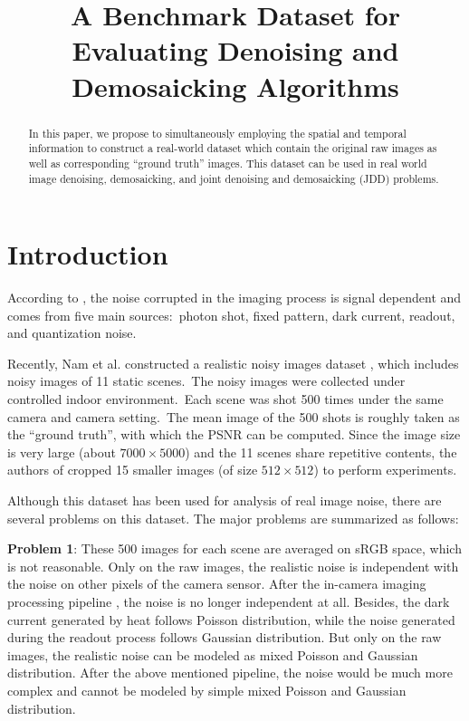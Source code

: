 \documentclass[10pt,twocolumn,letterpaper]{article}
\begin{document}
\title{A Benchmark Dataset for Evaluating Denoising and Demosaicking Algorithms}

\maketitle



\begin{abstract}
In this paper, we propose to simultaneously employing the spatial and temporal information to construct a real-world dataset which contain the original raw images as well as corresponding ``ground truth'' images. This dataset can be used in real world image denoising, demosaicking, and joint denoising and demosaicking (JDD) problems.
\end{abstract}

\section{Introduction}

According to \cite{healey1994radiometric}, the noise corrupted in the imaging process is signal dependent and comes from five main sources:\ photon shot, fixed pattern, dark current, readout, and quantization noise.

Recently, Nam et al. constructed a realistic noisy images dataset \cite{crosschannel2016}, which includes noisy images of 11 static scenes.\ The noisy images were collected under controlled indoor environment.\ Each scene was shot 500 times under the same camera and camera setting.\ The mean image of the 500 shots is roughly taken as the ``ground truth'', with which the PSNR can be computed. Since the image size is very large (about $7000\times5000$) and the 11 scenes share repetitive contents, the authors of \cite{crosschannel2016} cropped 15 smaller images (of size $512\times512$) to perform experiments.\

Although this dataset has been used for analysis of real image noise, there are several problems on this dataset. The major problems are summarized as follows:

\textbf{Problem 1}: These 500 images for each scene are averaged on sRGB space, which is not reasonable. Only on the raw images, the realistic noise is independent with the noise on other pixels of the camera sensor. After the in-camera imaging processing pipeline \cite{NewInCamera,crosschannel2016,karaimer_brown_ECCV_2016}, the noise is no longer independent at all. Besides, the dark current generated by heat follows Poisson distribution, while the noise generated during the readout process follows Gaussian distribution. But only on the raw images, the realistic noise can be modeled as mixed Poisson and Gaussian distribution. After the above mentioned pipeline, the noise would be much more complex and cannot be modeled by simple mixed Poisson and Gaussian distribution.
\end{document}
